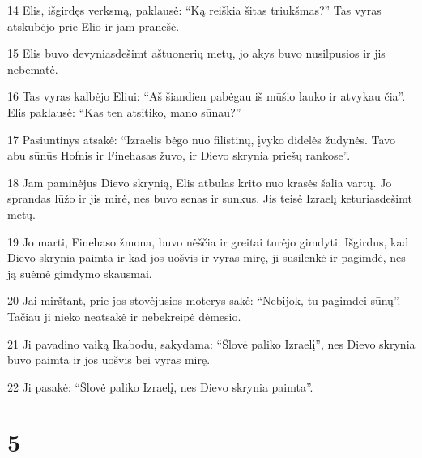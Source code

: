 \par 14 Elis, išgirdęs verksmą, paklausė: “Ką reiškia šitas triukšmas?” Tas vyras atskubėjo prie Elio ir jam pranešė. 
\par 15 Elis buvo devyniasdešimt aštuonerių metų, jo akys buvo nusilpusios ir jis nebematė. 
\par 16 Tas vyras kalbėjo Eliui: “Aš šiandien pabėgau iš mūšio lauko ir atvykau čia”. Elis paklausė: “Kas ten atsitiko, mano sūnau?” 
\par 17 Pasiuntinys atsakė: “Izraelis bėgo nuo filistinų, įvyko didelės žudynės. Tavo abu sūnūs Hofnis ir Finehasas žuvo, ir Dievo skrynia priešų rankose”. 
\par 18 Jam paminėjus Dievo skrynią, Elis atbulas krito nuo krasės šalia vartų. Jo sprandas lūžo ir jis mirė, nes buvo senas ir sunkus. Jis teisė Izraelį keturiasdešimt metų. 
\par 19 Jo marti, Finehaso žmona, buvo nėščia ir greitai turėjo gimdyti. Išgirdus, kad Dievo skrynia paimta ir kad jos uošvis ir vyras mirę, ji susilenkė ir pagimdė, nes ją suėmė gimdymo skausmai. 
\par 20 Jai mirštant, prie jos stovėjusios moterys sakė: “Nebijok, tu pagimdei sūnų”. Tačiau ji nieko neatsakė ir nebekreipė dėmesio. 
\par 21 Ji pavadino vaiką Ikabodu, sakydama: “Šlovė paliko Izraelį”, nes Dievo skrynia buvo paimta ir jos uošvis bei vyras mirę. 
\par 22 Ji pasakė: “Šlovė paliko Izraelį, nes Dievo skrynia paimta”.



\chapter{5}


